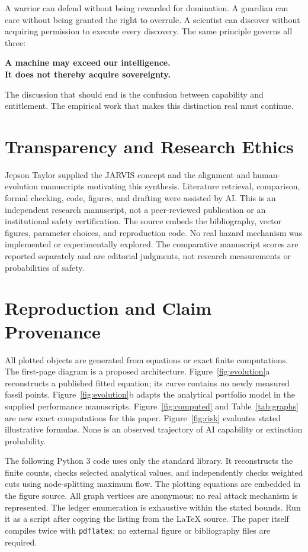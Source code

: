 \documentclass[10pt,twocolumn,letterpaper]{article}
\begin{document}
A warrior can defend without being rewarded for domination. A guardian can care without being granted the right to overrule. A scientist can discover without acquiring permission to execute every discovery. The same principle governs all three:
\begin{center}
\textbf{A machine may exceed our intelligence.\\It does not thereby acquire sovereignty.}
\end{center}
The discussion that should end is the confusion between capability and entitlement. The empirical work that makes this distinction real must continue.

\section*{Transparency and Research Ethics}
Jepson Taylor supplied the JARVIS concept and the alignment and human-evolution manuscripts motivating this synthesis. Literature retrieval, comparison, formal checking, code, figures, and drafting were assisted by AI. This is an independent research manuscript, not a peer-reviewed publication or an institutional safety certification. The source embeds the bibliography, vector figures, parameter choices, and reproduction code. No real hazard mechanism was implemented or experimentally explored. The comparative manuscript scores are reported separately and are editorial judgments, not research measurements or probabilities of safety.

\appendix
\section{Reproduction and Claim Provenance}
\label{app:repro}
All plotted objects are generated from equations or exact finite computations. The first-page diagram is a proposed architecture. Figure~\ref{fig:evolution}a reconstructs a published fitted equation; its curve contains no newly measured fossil points. Figure~\ref{fig:evolution}b adapts the analytical portfolio model in the supplied performance manuscripts. Figure~\ref{fig:computed} and Table~\ref{tab:graphs} are new exact computations for this paper. Figure~\ref{fig:risk} evaluates stated illustrative formulas. None is an observed trajectory of AI capability or extinction probability.

The following Python 3 code uses only the standard library. It reconstructs the finite counts, checks selected analytical values, and independently checks weighted cuts using node-splitting maximum flow. The plotting equations are embedded in the figure source. All graph vertices are anonymous; no real attack mechanism is represented. The ledger enumeration is exhaustive within the stated bounds. Run it as a script after copying the listing from the \LaTeX{} source. The paper itself compiles twice with \texttt{pdflatex}; no external figure or bibliography files are required.
\end{document}
